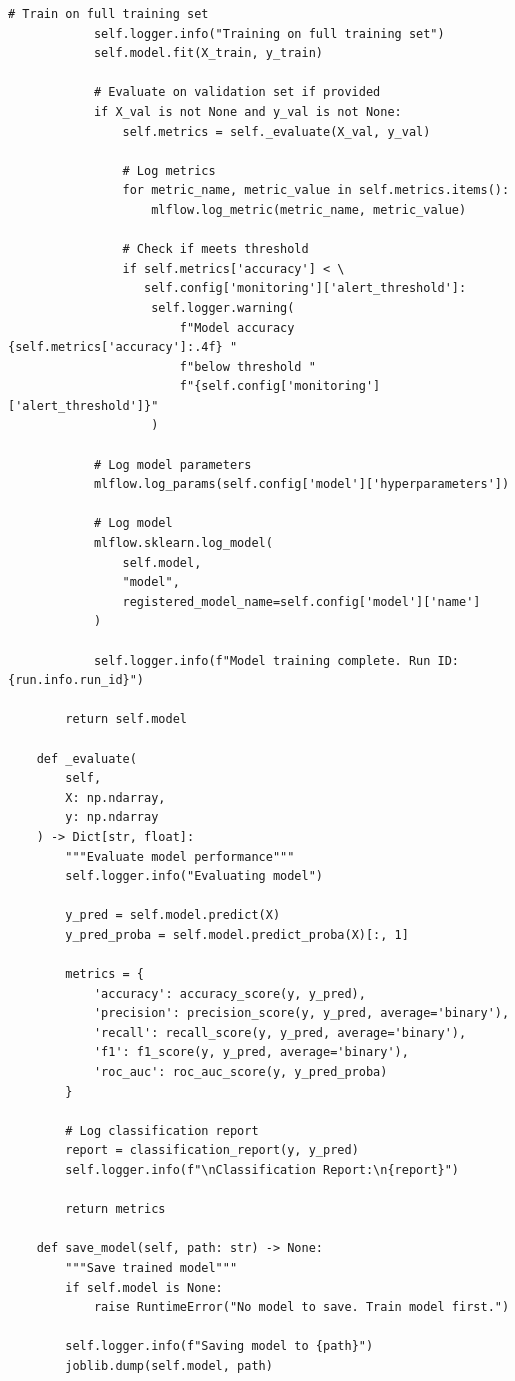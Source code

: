 \begin{lstlisting}[style=python, caption=Production ML Pipeline - Training Module]
            # Train on full training set
            self.logger.info("Training on full training set")
            self.model.fit(X_train, y_train)

            # Evaluate on validation set if provided
            if X_val is not None and y_val is not None:
                self.metrics = self._evaluate(X_val, y_val)

                # Log metrics
                for metric_name, metric_value in self.metrics.items():
                    mlflow.log_metric(metric_name, metric_value)

                # Check if meets threshold
                if self.metrics['accuracy'] < \
                   self.config['monitoring']['alert_threshold']:
                    self.logger.warning(
                        f"Model accuracy {self.metrics['accuracy']:.4f} "
                        f"below threshold "
                        f"{self.config['monitoring']['alert_threshold']}"
                    )

            # Log model parameters
            mlflow.log_params(self.config['model']['hyperparameters'])

            # Log model
            mlflow.sklearn.log_model(
                self.model,
                "model",
                registered_model_name=self.config['model']['name']
            )

            self.logger.info(f"Model training complete. Run ID: {run.info.run_id}")

        return self.model

    def _evaluate(
        self,
        X: np.ndarray,
        y: np.ndarray
    ) -> Dict[str, float]:
        """Evaluate model performance"""
        self.logger.info("Evaluating model")

        y_pred = self.model.predict(X)
        y_pred_proba = self.model.predict_proba(X)[:, 1]

        metrics = {
            'accuracy': accuracy_score(y, y_pred),
            'precision': precision_score(y, y_pred, average='binary'),
            'recall': recall_score(y, y_pred, average='binary'),
            'f1': f1_score(y, y_pred, average='binary'),
            'roc_auc': roc_auc_score(y, y_pred_proba)
        }

        # Log classification report
        report = classification_report(y, y_pred)
        self.logger.info(f"\nClassification Report:\n{report}")

        return metrics

    def save_model(self, path: str) -> None:
        """Save trained model"""
        if self.model is None:
            raise RuntimeError("No model to save. Train model first.")

        self.logger.info(f"Saving model to {path}")
        joblib.dump(self.model, path)
\end{lstlisting}

